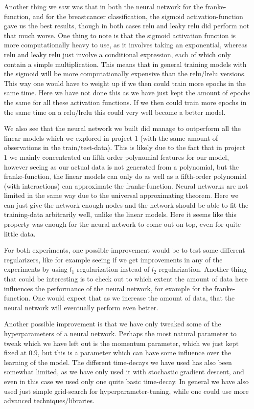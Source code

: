 \documentclass{article}
\begin{document}
Another thing we saw was that in both the neural network for the
franke-function, and for the breastcancer classification, the sigmoid
activation-function gave us the best results, though in both cases relu and
leaky relu did perform not that much worse. One thing to note is that the
sigmoid activation function is more computationally heavy to use, as it involves
taking an exponential, whereas relu and leaky relu just involve a conditional
expression, each of which only contain a simple multiplication. This means that
in general training models with the sigmoid will be more computationally
expensive than the relu/lrelu versions. This way one would have to weight up if
we then could train more epochs in the same time. Here we have not done this as
we have just kept the amount of epochs the same for all these activation
functions. If we then could train more epochs in the same time on a relu/lrelu
this could very well become a better model.

We also see that the neural network we built did manage to outperform all the
linear models which we explored in project 1 (with the same amount of
observations in the train/test-data). This is likely due to the fact that in
project $1$ we mainly concentrated on fifth order polynomial features for our
model, however seeing as our actual data is not generated from a polynomial, but
the franke-function, the linear models can only do as well as a fifth-order
polynomial (with interactions) can approximate the franke-function.  Neural
networks are not limited in the same way due to the universal approximating
theorem. Here we can just give the network enough nodes and the network should
be able to fit the training-data arbitrarily well, unlike the linear models.
Here it seems like this property was enough for the neural network to come out
on top, even for quite little data.

For both experiments, one possible improvement would be to test some different
regularizers, like for example seeing if we get improvements in any of the
experiments by using $l_1$ regularization instead of $l_2$ regularization.
Another thing that could be interesting is to check out to which extent the amount of
data here influences the performance of the neural network, for example for the
franke-function.  One would expect that as we increase the amount of data, that
the neural network will eventually perform even better.

Another possible improvement is that we have only tweaked some of the
hyperparameters of a neural network. Perhaps the most natural parameter to tweak
which we have left out is the momentum parameter, which we just kept fixed at
$0.9$, but this is a parameter which can have some influence over the learning
of the model. The different time-decays we have used has also been somewhat
limited, as we have only used it with stochastic gradient descent, and even in
this case we used only one quite basic time-decay. In general we have also used
just simple grid-search for hyperparameter-tuning, while one could use more
advanced techniques/libraries.
\end{document}
